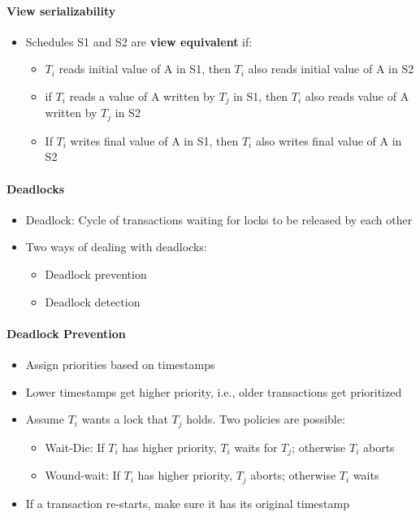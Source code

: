 \paragraph{View serializability}
\begin{itemize}
\item Schedules S1 and S2 are \textbf{view equivalent} if:
  \begin{itemize}
  \item $T_i$ reads initial value of A in S1, then $T_i$ also
    reads initial value of A in S2
  \item if $T_i$ reads a value of A written by $T_j$ in S1, then
    $T_i$ also reads value of A written by $T_j$ in S2
  \item If $T_i$ writes final value of A in S1, then $T_i$ also
    writes final value of A in S2
  \end{itemize}
\end{itemize}


\paragraph{Deadlocks}
\begin{itemize}
\item Deadlock: Cycle of transactions waiting for locks to be
  released by each other

\item Two ways of dealing with deadlocks:
  \begin{itemize}
  \item Deadlock prevention
  \item Deadlock detection
  \end{itemize}
\end{itemize}

\paragraph{Deadlock Prevention}
\begin{itemize}
\item Assign priorities based on timestamps
\item Lower timestamps get higher priority, i.e.,
  older transactions get prioritized
\item Assume $T_i$ wants a lock that $T_j$ holds. Two
  policies are possible:
  \begin{itemize}
  \item Wait-Die: If $T_i$ has higher priority, $T_i$ waits for
    $T_j$; otherwise $T_i$ aborts
  \item Wound-wait: If $T_i$ has higher priority, $T_j$ aborts;
    otherwise $T_i$ waits
  \end{itemize}

\item If a transaction re-starts, make sure it has its
  original timestamp
\end{itemize}


